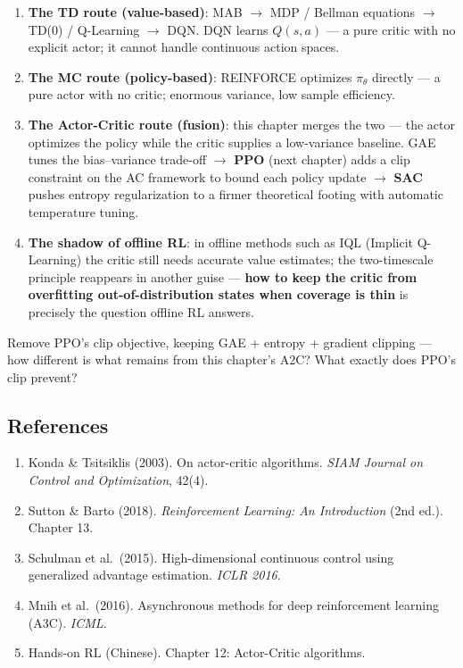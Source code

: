\documentclass{article}
\begin{document}
\begin{enumerate}
  \item \textbf{The TD route (value-based)}: MAB $\to$ MDP / Bellman equations $\to$ TD(0) / Q-Learning $\to$ DQN. DQN learns $Q(s,a)$ --- a pure critic with no explicit actor; it cannot handle continuous action spaces.

  \item \textbf{The MC route (policy-based)}: REINFORCE optimizes $\pi_\theta$ directly --- a pure actor with no critic; enormous variance, low sample efficiency.

  \item \textbf{The Actor-Critic route (fusion)}: this chapter merges the two --- the actor optimizes the policy while the critic supplies a low-variance baseline. GAE tunes the bias--variance trade-off $\to$ \textbf{PPO} (next chapter) adds a clip constraint on the AC framework to bound each policy update $\to$ \textbf{SAC} pushes entropy regularization to a firmer theoretical footing with automatic temperature tuning.

  \item \textbf{The shadow of offline RL}: in offline methods such as IQL (Implicit Q-Learning) the critic still needs accurate value estimates; the two-timescale principle reappears in another guise --- \textbf{how to keep the critic from overfitting out-of-distribution states when coverage is thin} is precisely the question offline RL answers.
\end{enumerate}

Remove PPO's clip objective, keeping GAE + entropy + gradient clipping --- how different is what remains from this chapter's A2C? What exactly does PPO's clip prevent?

\subsection*{References}

\begin{enumerate}
  \item Konda \& Tsitsiklis (2003). On actor-critic algorithms. \textit{SIAM Journal on Control and Optimization}, 42(4).
  \item Sutton \& Barto (2018). \textit{Reinforcement Learning: An Introduction} (2nd ed.). Chapter 13.
  \item Schulman et al.\ (2015). High-dimensional continuous control using generalized advantage estimation. \textit{ICLR 2016}.
  \item Mnih et al.\ (2016). Asynchronous methods for deep reinforcement learning (A3C). \textit{ICML}.
  \item Hands-on RL (Chinese). Chapter 12: Actor-Critic algorithms.
\end{enumerate}
\end{document}
